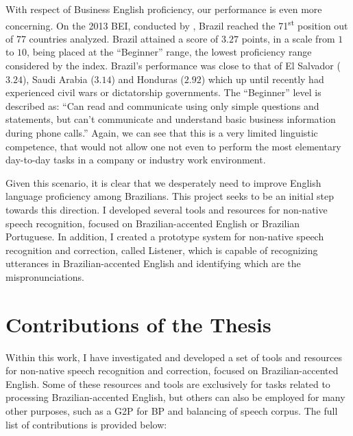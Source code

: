 With respect of Business English proficiency, our performance is even more concerning. On the 
2013 \ac{BEI}, conducted by \citeauthor{BEI2013} \cite{BEI2013}, Brazil reached the 71\textsuperscript{st} position out of 77 countries analyzed. Brazil attained a score of $3.27$ points, in a scale from $1$ to $10$, being placed at the ``Beginner'' range, the lowest proficiency range considered by the index. Brazil's performance was close to that of El Salvador ($3.24$), Saudi Arabia ($3.14$) and Honduras ($2.92$) which up until recently had experienced civil wars or dictatorship governments. The ``Beginner'' level is described as: ``Can read and communicate using only simple questions and statements, but can't communicate and understand basic business information during phone calls.'' Again, we can see that this is a very limited linguistic competence, that would not allow one not even to perform the most elementary day-to-day tasks in a company or industry work environment.

Given this scenario, it is clear that we desperately need to improve English language proficiency among Brazilians. This project seeks to be an initial step towards this direction. I developed several tools and resources for non-native speech recognition, focused on Brazilian-accented English or Brazilian Portuguese. In addition,  I created a prototype system for non-native speech recognition and correction, called Listener, which is capable of recognizing utterances in Brazilian-accented English and identifying which are the mispronunciations.

\section*{Contributions of the Thesis}

Within this work, I have investigated and developed a set of tools and resources for non-native speech recognition and correction, focused on Brazilian-accented English. Some of these resources and tools are exclusively for tasks related to processing Brazilian-accented English, but others can also be employed for many other purposes, such as a \ac{G2P} for \ac{BP} and balancing of speech corpus. The full list of contributions is provided below:

